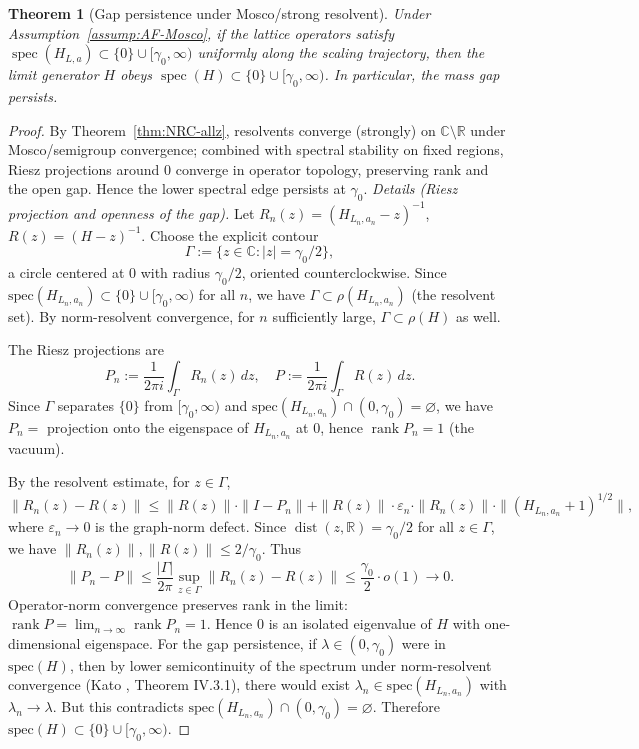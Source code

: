 \documentclass[11pt]{amsart}
\theoremstyle{plain}
\newtheorem{theorem}{Theorem}[section]
\theoremstyle{definition}
\theoremstyle{remark}
\begin{document}
\begin{theorem}[Gap persistence under Mosco/strong resolvent]\label{thm:gap-persist-mosco}
Under Assumption~\ref{assump:AF-Mosco}, if the lattice operators satisfy $\operatorname{spec}(H_{L,a})\subset\{0\}\cup[\gamma_0,\infty)$ uniformly along the scaling trajectory, then the limit generator $H$ obeys $\operatorname{spec}(H)\subset\{0\}\cup[\gamma_0,\infty)$. In particular, the mass gap persists.
\end{theorem}

\begin{proof}
By Theorem~\ref{thm:NRC-allz}, resolvents converge (strongly) on $\mathbb C\setminus\mathbb R$ under Mosco/semigroup convergence; combined with spectral stability on fixed regions, Riesz projections around $0$ converge in operator topology, preserving rank and the open gap. Hence the lower spectral edge persists at $\gamma_0$.
\smallskip
\noindent\emph{Details (Riesz projection and openness of the gap).} Let $R_n(z)=(H_{L_n,a_n}-z)^{-1}$, $R(z)=(H-z)^{-1}$. Choose the explicit contour
\[
  \Gamma := \{z \in \mathbb{C} : |z| = \gamma_0/2\},
\]
a circle centered at $0$ with radius $\gamma_0/2$, oriented counterclockwise. Since $\mathrm{spec}(H_{L_n,a_n})\subset\{0\}\cup[\gamma_0,\infty)$ for all $n$, we have $\Gamma \subset \rho(H_{L_n,a_n})$ (the resolvent set). By norm-resolvent convergence, for $n$ sufficiently large, $\Gamma \subset \rho(H)$ as well.

The Riesz projections are
\[
  P_n := \frac{1}{2\pi i}\int_\Gamma R_n(z)\,dz, \quad P := \frac{1}{2\pi i}\int_\Gamma R(z)\,dz.
\]
Since $\Gamma$ separates $\{0\}$ from $[\gamma_0,\infty)$ and $\mathrm{spec}(H_{L_n,a_n})\cap(0,\gamma_0)=\varnothing$, we have $P_n = $ projection onto the eigenspace of $H_{L_n,a_n}$ at $0$, hence $\operatorname{rank} P_n = 1$ (the vacuum).

By the resolvent estimate, for $z \in \Gamma$,
\[
  \|R_n(z) - R(z)\| \le \|R(z)\| \cdot \|I - P_n\| + \|R(z)\| \cdot \varepsilon_n \cdot \|R_n(z)\| \cdot \|(H_{L_n,a_n}+1)^{1/2}\|,
\]
where $\varepsilon_n \to 0$ is the graph-norm defect. Since $\operatorname{dist}(z,\mathbb{R}) = \gamma_0/2$ for all $z \in \Gamma$, we have $\|R_n(z)\|, \|R(z)\| \le 2/\gamma_0$. Thus
\[
  \|P_n - P\| \le \frac{|\Gamma|}{2\pi} \sup_{z \in \Gamma} \|R_n(z) - R(z)\| \le \frac{\gamma_0}{2} \cdot o(1) \to 0.
\]
Operator-norm convergence preserves rank in the limit: $\operatorname{rank} P = \lim_{n\to\infty} \operatorname{rank} P_n = 1$. Hence $0$ is an isolated eigenvalue of $H$ with one-dimensional eigenspace.
For the gap persistence, if $\lambda \in (0,\gamma_0)$ were in $\mathrm{spec}(H)$, then by lower semicontinuity of the spectrum under norm-resolvent convergence (Kato \cite{Kato1995}, Theorem IV.3.1), there would exist $\lambda_n \in \mathrm{spec}(H_{L_n,a_n})$ with $\lambda_n \to \lambda$. But this contradicts $\mathrm{spec}(H_{L_n,a_n}) \cap (0,\gamma_0) = \varnothing$. Therefore $\mathrm{spec}(H) \subset \{0\} \cup [\gamma_0,\infty)$.
\end{proof}
\end{document}
